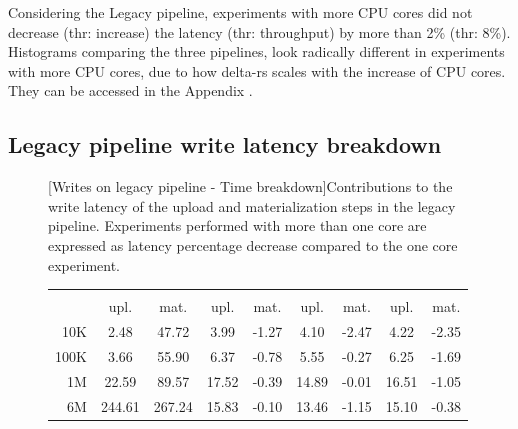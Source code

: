 Considering the Legacy pipeline, experiments with more \gls{CPU} cores did not decrease (thr: increase) the latency (thr: throughput) by more than 2\% (thr: 8\%). Histograms comparing the three pipelines, look radically different in experiments with more \gls{CPU} cores, due to how delta-rs scales with the increase of \gls{CPU} cores. They can be accessed in the Appendix .

\subsection{Legacy pipeline write latency breakdown}

\begin{figure}
    \centering
    \begin{minipage}[b]{\textwidth}
        [Writes on legacy pipeline - Time breakdown]{Contributions to the write latency of the upload and materialization steps in the legacy pipeline. Experiments performed with more than one  core are expressed as latency percentage decrease compared to the one  core experiment.}
        \label{tbl:hudi_virtualiz_breakdown_cpu_perc}
        \begin{tabular}{r S[table-format=4.2] S[table-format=4.2] S[table-format=2.2] S[table-format=2.2] S[table-format=2.2] S[table-format=2.2] S[table-format=2.2] S[table-format=2.2]} 
            \toprule
             &  &  &  & \\
            & {upl.} & {mat.} & {upl.} & {mat.} & {upl.} & {mat.} & {upl.} & {mat.}\\
            \midrule
            10K &  2.48 & 47.72 & 3.99 & -1.27 & 4.10 & -2.47 & 4.22 & -2.35\\
            100K & 3.66 & 55.90 & 6.37 & -0.78 & 5.55 & -0.27 & 6.25 & -1.69\\
            1M   & 22.59 & 89.57 & 17.52 & -0.39 & 14.89 & -0.01 & 16.51 & -1.05\\
            6M   & 244.61 & 267.24 & 15.83 & -0.10 & 13.46 & -1.15 & 15.10 & -0.38\\

\end{tabular}
\end{minipage}
\end{figure}
